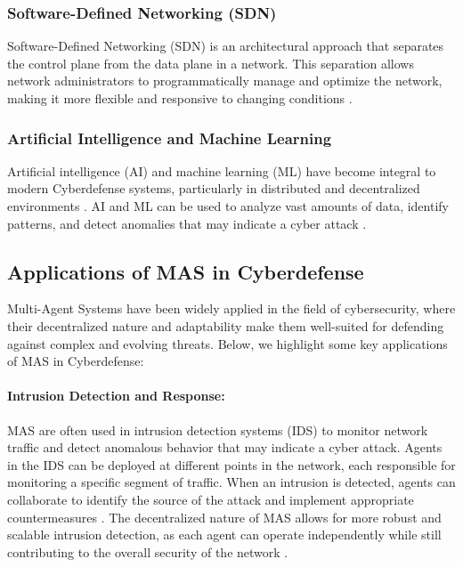 \subsubsection{Software-Defined Networking (SDN)}

Software-Defined Networking (SDN) is an architectural approach that separates the control plane from the data plane in a network. This separation allows network administrators to programmatically manage and optimize the network, making it more flexible and responsive to changing conditions \cite{Kreutz2015}.

\subsubsection{Artificial Intelligence and Machine Learning}

Artificial intelligence (AI) and machine learning (ML) have become integral to modern Cyberdefense systems, particularly in distributed and decentralized environments \cite{Buczak2016}. AI and ML can be used to analyze vast amounts of data, identify patterns, and detect anomalies that may indicate a cyber attack \cite{Vinayakumar2019}.


\subsection{Applications of MAS in Cyberdefense}

Multi-Agent Systems have been widely applied in the field of cybersecurity, where their decentralized nature and adaptability make them well-suited for defending against complex and evolving threats. Below, we highlight some key applications of MAS in Cyberdefense:

\paragraph{Intrusion Detection and Response:}
MAS are often used in intrusion detection systems (IDS) to monitor network traffic and detect anomalous behavior that may indicate a cyber attack. Agents in the IDS can be deployed at different points in the network, each responsible for monitoring a specific segment of traffic. When an intrusion is detected, agents can collaborate to identify the source of the attack and implement appropriate countermeasures \cite{kolias2011swarm}. The decentralized nature of MAS allows for more robust and scalable intrusion detection, as each agent can operate independently while still contributing to the overall security of the network \cite{kolias2011swarm}.

